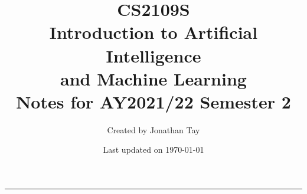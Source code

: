 \documentclass{article}
\title{\textbf{CS2109S \\[0.25em] Introduction to Artificial Intelligence \\ and Machine Learning} \\[2em] \Large Notes for AY2021/22 Semester 2 \\[1em]}
\author{Created by Jonathan Tay}
\date{Last updated on \today}
\newcommand{\pageline}[1]{\par\noindent\rule{\textwidth}{#1}}
\begin{document}
    \maketitle
    \pageline{1.5pt}
    \tableofcontents
    \newpage

    
\end{document}
